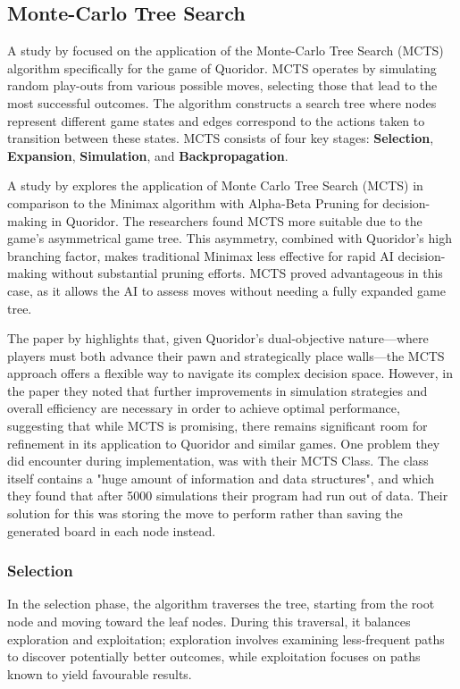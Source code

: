 \documentclass[review]{cmpreport}
\begin{document}
\subsection{Monte-Carlo Tree Search}
A study by \cite{respall2018monte} focused on the application of the Monte-Carlo Tree Search (MCTS) algorithm specifically for the game of Quoridor. MCTS operates by simulating random play-outs from various possible moves, selecting those that lead to the most successful outcomes. The algorithm constructs a search tree where nodes represent different game states and edges correspond to the actions taken to transition between these states. MCTS consists of four key stages: \textbf{Selection}, \textbf{Expansion}, \textbf{Simulation}, and \textbf{Backpropagation}.
\newline

\noindent A study by \cite{brenner2015artificial} explores the application of Monte Carlo Tree Search (MCTS) in comparison to the Minimax algorithm with Alpha-Beta Pruning for decision-making in Quoridor. The researchers found MCTS more suitable due to the game's asymmetrical game tree. This asymmetry, combined with Quoridor's high branching factor, makes traditional Minimax less effective for rapid AI decision-making without substantial pruning efforts. MCTS proved advantageous in this case, as it allows the AI to assess moves without needing a fully expanded game tree.
\newline

\noindent The paper by \cite{respall2018monte} highlights that, given Quoridor's dual-objective nature—where players must both advance their pawn and strategically place walls—the MCTS approach offers a flexible way to navigate its complex decision space. However, in the paper they noted that further improvements in simulation strategies and overall efficiency are necessary in order to achieve optimal performance, suggesting that while MCTS is promising, there remains significant room for refinement in its application to Quoridor and similar games. One problem they did encounter during implementation, was with their MCTS Class. The class itself contains a "huge amount of information and data structures", and which they found that after 5000 simulations their program had run out of data. Their solution for this was storing the move to perform rather than saving the generated board in each node instead.

\subsubsection{Selection}
In the selection phase, the algorithm traverses the tree, starting from the root node and moving toward the leaf nodes. During this traversal, it balances exploration and exploitation; exploration involves examining less-frequent paths to discover potentially better outcomes, while exploitation focuses on paths known to yield favourable results.
\end{document}
